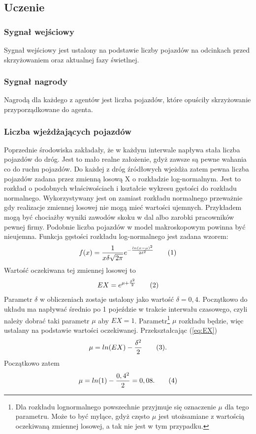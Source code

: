 \documentclass[12pt]{book}
\theoremstyle{plain}
\newcommand\addtag{\refstepcounter{equation}
\renewcommand{\labelenumii}{\theenumii}
\renewcommand{\theenumii}{\theenumi.\arabic{enumii}.}
\tag{\theequation}}
\newcommand{\myref}[1]{(\ref{#1})}
\begin{document}
\subsection{Uczenie}
\subsubsection*{Sygnał wejściowy}
Sygnał wejściowy jest ustalony na podstawie liczby pojazdów na odcinkach przed skrzyżowaniem oraz aktualnej fazy świetlnej.
\subsubsection*{Sygnał nagrody}
Nagrodą dla każdego z agentów jest liczba pojazdów, które opuściły skrzyżowanie przyporządkowane do agenta.
\subsubsection{Liczba wjeżdżających pojazdów}
Poprzednie środowiska zakładały, że w każdym interwale napływa stała liczba pojazdów do dróg. Jest to mało realne założenie, gdyż zawsze są pewne wahania co do ruchu pojazdów. Do każdej z dróg źródłowych wjeżdża zatem pewna liczba pojazdów zadana przez zmienną losową X o rozkładzie log-normalnym. Jest to rozkład o podobnych właściwościach i kształcie wykresu gęstości do rozkładu normalnego. Wykorzystywany jest on zamiast rozkładu normalnego przeważnie gdy realizacje zmiennej losowej nie mogą mieć wartości ujemnych. Przykładem mogą być chociażby wyniki zawodów skoku w dal albo zarobki pracowników pewnej firmy. Podobnie liczba pojazdów w model makroskopowym powinna być nieujemna. Funkcja gęstości rozkładu log-normalnego jest zadana wzorem:
\[ f(x)=\frac{1}{x\delta\sqrt{2\pi}}e^{-\frac{ln(x-\mu)^2}{2\delta^2}} \addtag \]
Wartość oczekiwana tej zmiennej losowej to \[EX=e^{\mu+\frac{\delta^2}{2}} \addtag \label{eq:EX}\] Parametr $\delta$ w obliczeniach zostaje ustalony jako wartość $\delta=0,4$. Początkowo do układu ma napływać średnio po 1 pojeździe w trakcie interwału czasowego, czyli należy dobrać taki parametr $\mu$ aby $EX=1$. Parametr\footnote{Dla rozkładu lognormalnego powszechnie przyjmuje się oznaczenie $\mu$ dla tego parametru. Może to być mylące, gdyż często $\mu$ jest utożsamiane z wartością oczekiwaną zmiennej losowej, a tak nie jest w tym przypadku. }  $\mu$ rozkładu będzie, więc ustalany na podstawie wartości oczekiwanej. Przekształcając \myref{eq:EX} \[\mu=ln(EX)-\frac{\delta^2}{2} \addtag \label{eq:mu}.\] Początkowo zatem \[\mu=ln(1)-\frac{0,4^2}{2}=0,08. \addtag \] 
\end{document}
